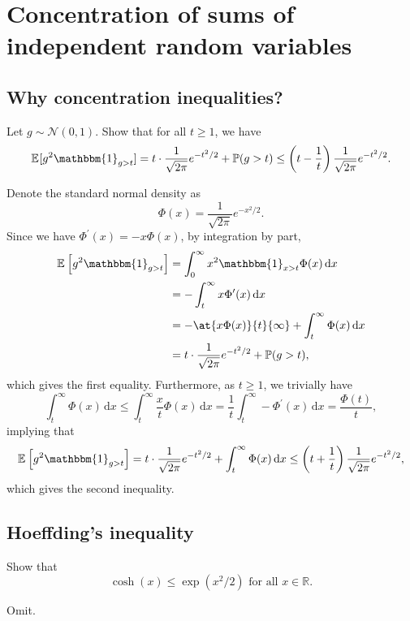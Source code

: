 \chapter{Concentration of sums of independent random variables}

\section{Why concentration inequalities?}
\begin{problem*}[Exercise 2.1.4]\label{ex2.1.4}
	Let \(g \sim \mathcal{N} (0, 1)\). Show that for all \(t \geq 1\), we have
	\[
		\mathbb{E}_{}[g^2 \mathbbm{1}_{g > t}]
		= t \cdot \frac{1}{\sqrt{2 \pi } } e^{-t^2 / 2} + \mathbb{P} (g > t)
		\leq \left( t - \frac{1}{t} \right) \frac{1}{\sqrt{2\pi } } e^{-t^2 / 2}.
	\]
\end{problem*}
\begin{answer}
	Denote the standard normal density as
	\[
		\Phi (x)
		= \frac{1}{\sqrt{2\pi } } e^{-x^2 / 2}.
	\]
	Since we have \(\Phi ^{\prime} (x) = -x \Phi (x)\), by integration by part,
	\[
		\begin{split}
			\mathbb{E}_{}\left[g^2 \mathbbm{1}_{g > t}  \right]
			 & = \int_{0}^{\infty} x^2 \mathbbm{1}_{x > t} \Phi (x) \,\mathrm{d}x         \\
			 & = -\int_{t}^{\infty} x \Phi ^{\prime} (x)\,\mathrm{d}x                     \\
			 & = - \at{x \Phi (x)}{t}{\infty } + \int_{t}^{\infty} \Phi (x) \,\mathrm{d}x \\
			 & = t\cdot \frac{1}{\sqrt{2\pi } } e^{-t^2 / 2} + \mathbb{P} (g > t),
		\end{split}
	\]
	which gives the first equality. Furthermore, as \(t \geq 1\), we trivially have
	\[
		\int_{t}^{\infty} \Phi (x) \,\mathrm{d}x
		\leq \int_{t}^{\infty} \frac{x}{t} \Phi (x) \,\mathrm{d}x
		= \frac{1}{t} \int_{t}^{\infty} - \Phi ^{\prime} (x) \,\mathrm{d}x
		= \frac{\Phi (t)}{t},
	\]
	implying that
	\[
		\mathbb{E}_{}\left[g^2 \mathbbm{1}_{g > t}  \right]
		= t\cdot \frac{1}{\sqrt{2\pi } }e^{-t^2 / 2} + \int_{t}^{\infty} \Phi (x) \,\mathrm{d}x
		\leq \left( t + \frac{1}{t} \right) \frac{1}{\sqrt{2\pi } }e^{-t^2 / 2},
	\]
	which gives the second inequality.
\end{answer}

\section{Hoeffding's inequality}
\begin{problem*}[Exercise 2.2.3]\label{ex2.2.3}
	Show that
	\[
		\cosh (x)
		\leq \exp (x^2 / 2)
		\text{ for all } x \in \mathbb{R} .
	\]
\end{problem*}
\begin{answer}
	Omit.
\end{answer}


